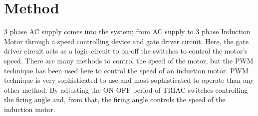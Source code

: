 \section{Method}
3 phase AC supply comes into the system; from AC supply to 3 phase Induction Motor through a speed controlling device and gate driver circuit. Here, the gate driver circuit acts as a logic circuit to on-off the switches to control the motor's speed. There are many methods to control the speed of the motor, but the PWM technique has been used here to control the speed of an induction motor. PWM technique is very sophisticated to use and most sophisticated to operate than any other method. By adjusting the ON-OFF period of TRIAC switches controlling the firing angle and, from that, the firing angle controls the speed of the induction motor.




